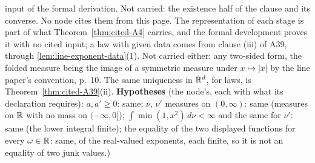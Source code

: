 \begin{theorem}
{input of the formal derivation. Not carried: the existence half of the clause and its converse. No
node cites them from this page. The representation of each stage is part of what
Theorem~\ref{thm:cited-A4} carries, and the formal development proves it with no cited input; a law with
given data comes from clause (iii) of A39, through \ref{lem:line-exponent-data}(1). Not carried
either: any two-sided form, the folded measure being the image of a symmetric \Levy{} measure
under $x \mapsto |x|$ by the line paper's convention, p.~10. The same uniqueness in $\mathbb{R}^d$, for
laws, is Theorem~\ref{thm:cited-A39}(ii).
\textbf{Hypotheses} (the node's, each with what its declaration requires): $a, a' \ge 0$: same;
$\nu$, $\nu'$ measures on $(0,\infty)$: same (measures on $\mathbb{R}$ with no mass on $(-\infty, 0]$);
$\int\min(1, x^2)\,d\nu < \infty$ and the same for $\nu'$: same (the lower integral finite); the
equality of the two displayed functions for every $\omega \in \mathbb{R}$: same, of the real-valued
exponents, each finite, so it is not an equality of two junk values.)}
\end{theorem}

